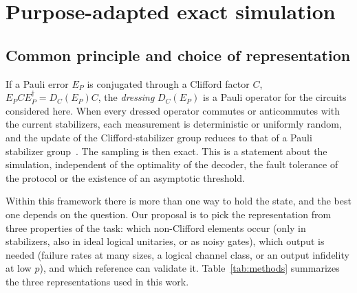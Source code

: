 \documentclass[a4paper]{article}
\begin{document}
\section{Purpose-adapted exact simulation}
\label{sec:methods}

\subsection{Common principle and choice of representation}

If a Pauli error $E_P$ is conjugated through a Clifford factor $C$, $E_PCE_P^\dagger=D_C(E_P)C$, the \emph{dressing} $D_C(E_P)$ is a Pauli operator for the circuits considered here. When every dressed operator commutes or anticommutes with the current stabilizers, each measurement is deterministic or uniformly random, and the update of the Clifford-stabilizer group reduces to that of a Pauli stabilizer group~\cite{takada2026exact}. The sampling is then exact. This is a statement about the simulation, independent of the optimality of the decoder, the fault tolerance of the protocol or the existence of an asymptotic threshold.

Within this framework there is more than one way to hold the state, and the best one depends on the question. Our proposal is to pick the representation from three properties of the task: which non-Clifford elements occur (only in stabilizers, also in ideal logical unitaries, or as noisy gates), which output is needed (failure rates at many sizes, a logical channel class, or an output infidelity at low $p$), and which reference can validate it. Table~\ref{tab:methods} summarizes the three representations used in this work.
\end{document}
